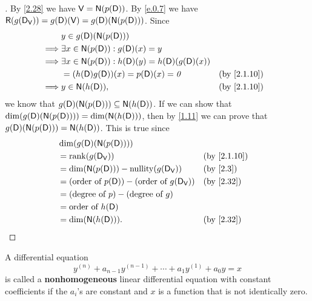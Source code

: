 \begin{proof}[]
  By \cref{2.28} we have \(\V = \ns{p(\Dop)}\).
  By \cref{e.0.7} we have \(\rg{g(\Dop_{\V})} = g(\Dop)(\V) = g(\Dop)(\ns{p(\Dop)})\).
  Since
  \begin{align*}
             & y \in g(\Dop)(\ns{p(\Dop)})                                                    \\
    \implies & \exists x \in \ns{p(\Dop)} : g(\Dop)(x) = y                                    \\
    \implies & \exists x \in \ns{p(\Dop)} : h(\Dop)(y) = h(\Dop)(g(\Dop)(x))                  \\
             & = (h(\Dop) g(\Dop))(x) = p(\Dop)(x) = \zv                     &  & \by{2.1.10} \\
    \implies & y \in \ns{h(\Dop)},                                           &  & \by{2.1.10}
  \end{align*}
  we know that \(g(\Dop)(\ns{p(\Dop)}) \subseteq \ns{h(\Dop)}\).
  If we can show that \(\dim(g(\Dop)(\ns{p(\Dop)})) = \dim(\ns{h(\Dop)})\), then by \cref{1.11} we can prove that \(g(\Dop)(\ns{p(\Dop)}) = \ns{h(\Dop)}\).
  This is true since
  \begin{align*}
     & \dim(g(\Dop)(\ns{p(\Dop)}))                                                     \\
     & = \rk{g(\Dop_{\V})}                                            &  & \by{2.1.10} \\
     & = \dim(\ns{p(\Dop)}) - \nt{g(\Dop_{\V})}                       &  & \by{2.3}    \\
     & = (\text{order of } p(\Dop)) - (\text{order of } g(\Dop_{\V})) &  & \by{2.32}   \\
     & = (\text{degree of } p) - (\text{degree of } g)                                 \\
     & = \text{order of } h(\Dop)                                                      \\
     & = \dim(\ns{h(\Dop)}).                                          &  & \by{2.32}
  \end{align*}
\end{proof}

\begin{defn}\label{2.7.16}
  A differential equation
  \[
    y^{(n)} + a_{n - 1} y^{(n - 1)} + \cdots + a_1 y^{(1)} + a_0 y = x
  \]
  is called a \textbf{nonhomogeneous} linear differential equation with constant coefficients if the \(a_i\)'s are constant and \(x\) is a function that is not identically zero.
\end{defn}

